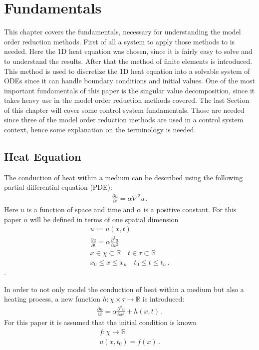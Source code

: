 \chapter{Fundamentals}
This chapter covers the fundamentals, necessary for understanding the model order reduction methods.
First of all a system to apply those methods to is needed.
Here the 1D heat equation was chosen, since it is fairly easy to solve and to understand the results.
After that the method of finite elements is introduced.
This method is used to discretize the 1D heat equation into a solvable system of ODEs since it can handle boundary conditions and initial values.
One of the most important fundamentals of this paper is the singular value decomposition, since it takes heavy use in the model order reduction methods covered.
The last Section of this chapter will cover some control system fundamentals.
Those are needed since three of the model order reduction methods are used in a control system context, hence some explanation on the terminology is needed.
\section{Heat Equation} \label{HE}
The conduction of heat  within a medium can be described using the following partial differential equation (PDE):
\begin{gather}
\frac{\partial u}{\partial t} = \alpha \nabla^{2} u\,. \label{heat}
\end{gather}
Here \(u\) is a function of space and time and \(\alpha\) is a positive constant.
For this paper \(u\) will be defined in terms of one spatial dimension \cite{Gustafsson2011}
\begin{gather}
u := u(x, t) \\
\frac{\partial u}{\partial t} = \alpha \frac{\partial^{2} u}{\partial x^{2}} \\
x \in \chi \subset \mathbb{R} \quad t \in \tau \subset \mathbb{R} \\
x_{0} \leq x \leq x_{n} \quad t_{0} \leq t \leq t_{n}\,.
\end{gather}
.

In order to not only model the conduction of heat within a medium but also a heating process, a new function \(h: \chi \times \tau \rightarrow  \mathbb{R}\) is introduced:
\begin{gather}
\frac{\partial u}{\partial t} = \alpha \frac{\partial^{2} u}{\partial x^{2}} + h(x,t)\,. \label{eq-1d-h}
\end{gather}
For this paper it is assumed that the initial condition is known
\begin{gather}
f: \chi \rightarrow \mathbb{R} \\
u(x, t_{0}) = f(x)\,.
\end{gather} 

